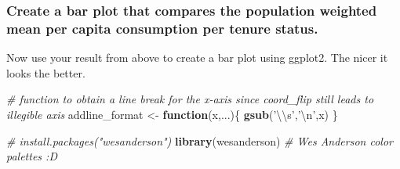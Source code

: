 \documentclass[
]{article}
\newenvironment{Shaded}{\begin{snugshade}}{\end{snugshade}}
\newcommand{\CharTok}[1]{\textcolor[rgb]{0.31,0.60,0.02}{#1}}
\newcommand{\CommentTok}[1]{\textcolor[rgb]{0.56,0.35,0.01}{\textit{#1}}}
\newcommand{\ControlFlowTok}[1]{\textcolor[rgb]{0.13,0.29,0.53}{\textbf{#1}}}
\newcommand{\KeywordTok}[1]{\textcolor[rgb]{0.13,0.29,0.53}{\textbf{#1}}}
\newcommand{\NormalTok}[1]{#1}
\newcommand{\StringTok}[1]{\textcolor[rgb]{0.31,0.60,0.02}{#1}}
\begin{document}
\hypertarget{create-a-bar-plot-that-compares-the-population-weighted-mean-per-capita-consumption-per-tenure-status.}{%
\subsubsection{Create a bar plot that compares the population weighted
mean per capita consumption per tenure
status.}\label{create-a-bar-plot-that-compares-the-population-weighted-mean-per-capita-consumption-per-tenure-status.}}

Now use your result from above to create a bar plot using ggplot2. The
nicer it looks the better.

\begin{Shaded}
\begin{Highlighting}[]
\CommentTok{# function to obtain a line break for the x-axis since coord_flip still leads to illegible axis}
\NormalTok{addline_format <-}\StringTok{ }\ControlFlowTok{function}\NormalTok{(x,...)\{ }
    \KeywordTok{gsub}\NormalTok{(}\StringTok{'}\CharTok{\textbackslash{}\textbackslash{}}\StringTok{s'}\NormalTok{,}\StringTok{'}\CharTok{\textbackslash{}n}\StringTok{'}\NormalTok{,x) }
\NormalTok{\} }

\CommentTok{# install.packages("wesanderson")}
\KeywordTok{library}\NormalTok{(wesanderson) }\CommentTok{# Wes Anderson color palettes :D}


\end{Highlighting}
\end{Shaded}
\end{document}
